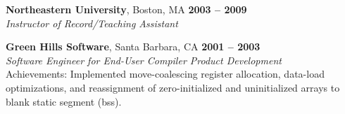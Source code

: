 \documentclass[margin,line,draft]{res}
\def\noneed#1{}
\def\coursetitle#1{\textsl{#1}}
\def\coursenum#1{#1}
\def\course#1#2{\coursenum{#1} \coursetitle{#2}}
\begin{document}
\begin{resume}
\newpage

    \textbf{Northeastern University}, Boston, MA \hfill \textbf{2003 -- 2009}\\\vspace{1mm}%
    \textsl{Instructor of Record/Teaching Assistant}

    \textbf{Green Hills Software}, Santa Barbara, CA \hfill \textbf{2001 -- 2003}\\\vspace{1mm}%
    \textsl{Software Engineer for End-User Compiler Product Development}
    \\
    Achievements: Implemented move-coalescing register allocation, data-load optimizations, and reassignment of zero-initialized and uninitialized arrays to blank static segment (bss).
%
% 
% 
% 

\noneed{
    \textbf{ESP High School Studies Program}, Cambridge, MA \vspace{2mm}\\\vspace{1mm}%
    \textsl{Instructor} \hfill \textbf{2001 -- 2001}\\
    Volunteer Instructor M-20A: \coursetitle{Square Peg Solutions}
    \noneed{Problem Solving via Decomposition, Visualization, and Abstraction}
}


\end{resume}
\end{document}
